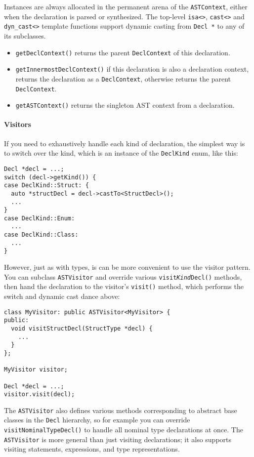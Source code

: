 \documentclass[a4paper,headsepline,bibliography=totoc,toc=flat,fleqn,twoside=semi]{scrbook}
\theoremstyle{definition}
\theoremstyle{definition}
\theoremstyle{definition}
\begin{document}
Instances are always allocated in the permanent arena of the \texttt{ASTContext}, either when the declaration is parsed or synthesized. The top-level \verb|isa<>|, \verb|cast<>| and \verb|dyn_cast<>| template functions support dynamic casting from \texttt{Decl *} to any of its subclasses.
\begin{itemize}
\item \texttt{getDeclContext()} returns the parent \texttt{DeclContext} of this declaration.
\item \texttt{getInnermostDeclContext()} if this declaration is also a declaration context, returns the declaration as a \texttt{DeclContext}, otherwise returns the parent \texttt{DeclContext}.
\item \texttt{getASTContext()} returns the singleton AST context from a declaration.
\end{itemize}

\paragraph{Visitors}
If you need to exhaustively handle each kind of declaration, the simplest way is to switch over the kind, which is an instance of the \texttt{DeclKind} enum, like this:
\begin{Verbatim}
Decl *decl = ...;
switch (decl->getKind()) {
case DeclKind::Struct: {
  auto *structDecl = decl->castTo<StructDecl>();
  ...
}
case DeclKind::Enum:
  ...
case DeclKind::Class:
  ...
}
\end{Verbatim}
However, just as with types, is can be more convenient to use the visitor pattern. You can subclass \texttt{ASTVisitor} and override various \texttt{visit\emph{Kind}Decl()} methods, then hand the declaration to the visitor's \texttt{visit()} method, which performs the switch and dynamic cast dance above:
\begin{Verbatim}
class MyVisitor: public ASTVisitor<MyVisitor> {
public:
  void visitStructDecl(StructType *decl) {
    ...
  }
};

MyVisitor visitor;

Decl *decl = ...;
visitor.visit(decl);
\end{Verbatim}
The \texttt{ASTVisitor} also defines various methods corresponding to abstract base classes in the \texttt{Decl} hierarchy, so for example you can override \texttt{visitNominalTypeDecl()} to handle all nominal type declarations at once. The \texttt{ASTVisitor} is more general than just visiting declarations; it also supports visiting statements, expressions, and type representations.
\end{document}
